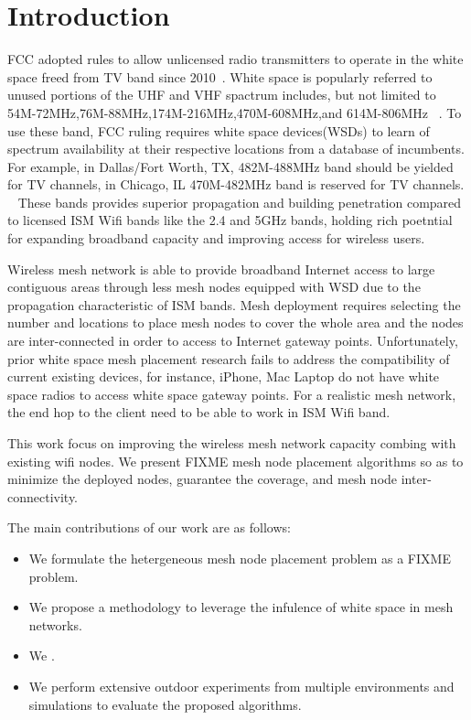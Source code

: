 
\section{Introduction}
\label{sec:introduction}

FCC adopted rules to allow unlicensed radio transmitters to operate in the white space freed from TV band since 2010~\cite{fccwhitespace}. White space is popularly referred to unused portions of the UHF and VHF spactrum includes, but not limited to 54M-72MHz,76M-88MHz,174M-216MHz,470M-608MHz,and 614M-806MHz ~\cite{whitespacewiki}.
To use these band, FCC ruling requires white space devices(WSDs) to learn of spectrum availability at their respective locations from a database of incumbents. For example, in Dallas/Fort Worth, TX, 482M-488MHz band should be yielded for TV channels, in Chicago, IL 470M-482MHz band is reserved for TV channels. ~\cite{boradband}
 These bands provides superior propagation and building penetration compared to licensed ISM Wifi bands like the 2.4 and 5GHz bands, holding rich poetntial for expanding broadband capacity and improving access for wireless users.

Wireless mesh network is able to provide broadband Internet access to large contiguous areas through less mesh nodes equipped with WSD due to the propagation characteristic of ISM bands. 
Mesh deployment requires selecting the number and locations to place mesh nodes to cover the whole area and the nodes are inter-connected in order to access to Internet gateway points.
Unfortunately, prior white space mesh placement research fails to address the compatibility of current existing devices, for instance, iPhone, Mac Laptop do not have white space radios to access white space gateway points. For a realistic mesh network, the end hop to the client need to be able to work in ISM Wifi band. 

This work focus on improving the wireless mesh network capacity combing with existing wifi nodes.
We present FIXME mesh node placement algorithms so as to minimize the deployed nodes, guarantee the coverage, and mesh node inter-connectivity.


% 

% 
The main contributions of our work are as follows:
\begin{itemize}
\item We formulate the hetergeneous mesh node placement problem as a FIXME problem.  

\item We propose a methodology to leverage the infulence of white space in mesh networks.

\item We .

\item We perform extensive outdoor experiments from multiple environments and simulations to evaluate the proposed algorithms.


\end{itemize}




